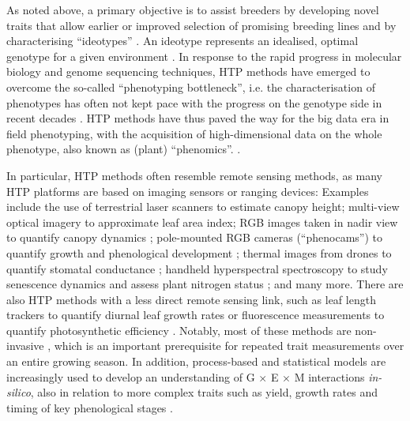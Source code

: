As noted above, a primary objective is to assist breeders by developing novel traits that allow earlier or improved selection of promising breeding lines \cite{watt_phenotyping_2020} and by characterising ``ideotypes'' \citep{roth_high-throughput_2022}. An ideotype represents an idealised, optimal genotype for a given environment \citep{donald_breeding_1968}. In response to the rapid progress in molecular biology and genome sequencing techniques, \gls{HTP} methods have emerged to overcome the so-called ``phenotyping bottleneck'', i.e. the characterisation of phenotypes has often not kept pace with the progress on the genotype side in recent decades \citep{araus_translating_2018, yang_crop_2020, song_high-throughput_2021}. \gls{HTP} methods have thus paved the way for the big data era in field phenotyping, with the acquisition of high-dimensional data on the whole phenotype, also known as (plant) ``phenomics''. \citep{houle_phenomics_2010}.

In particular, \gls{HTP} methods often resemble remote sensing methods, as many \gls{HTP} platforms are based on imaging sensors or ranging devices: Examples include the use of terrestrial laser scanners \citep{kronenberg_monitoring_2017} to estimate canopy height; multi-view optical imagery \citep{roth_extracting_2018} to approximate leaf area index; RGB images taken in nadir view to quantify canopy dynamics \citep{yu_image_2017}; pole-mounted RGB cameras (``phenocams'') to quantify growth and phenological development \citep{aasen_phenocams_2020}; thermal images from drones to quantify stomatal conductance \citep{perich_assessment_2020}; handheld hyperspectral spectroscopy to study senescence dynamics \citep{anderegg_spectral_2020} and assess plant nitrogen status \citep{perich_crop_2021}; and many more. There are also \gls{HTP} methods with a less direct remote sensing link, such as leaf length trackers to quantify diurnal leaf growth rates \citep{merz_relationship_2022} or fluorescence measurements to quantify photosynthetic efficiency \citep{keller_toward_2022}. Notably, most of these methods are non-invasive \citep{hund_non-invasive_2019}, which is an important prerequisite for repeated trait measurements over an entire growing season. In addition, process-based and statistical models are increasingly used to develop an understanding of G $\times$ E $\times$ M interactions \textsl{in-silico}, also in relation to more complex traits such as yield, growth rates and timing of key phenological stages \citep{martre_model-assisted_2015, roth_phenomics_2021, roth_phenomics_2022}.

